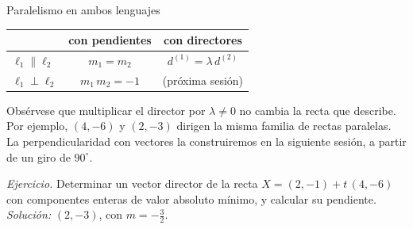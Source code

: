 \documentclass[aspectratio=169,10pt]{beamer}
\newcommand{\destaca}[1]{%
  \par\vspace{3pt}\noindent
  \colorbox{turquesaClaro}{%
    \parbox{\dimexpr\linewidth-2\fboxsep\relax}{\vspace{3pt}#1\vspace{3pt}}}%
  \par\vspace{3pt}}
\begin{document}
\begin{frame}{Paralelismo en ambos lenguajes}
  \centering
  {\small
  \begin{tabular}{@{}lcc@{}}
    \toprule
    & \textbf{con pendientes} & \textbf{con directores} \\
    \midrule
    $\ell_1 \parallel \ell_2$ & $m_1=m_2$ & $d^{(1)}=\lambda\, d^{(2)}$ \\
    $\ell_1 \perp \ell_2$ & $m_1\, m_2=-1$ & (próxima sesión) \\
    \bottomrule
  \end{tabular}}
  \par\vspace{0.5cm}
  \raggedright
  Obsérvese que multiplicar el director por $\lambda\neq 0$ no cambia
  la recta que describe. Por ejemplo, $(4,-6)$ y $(2,-3)$ dirigen la
  misma familia de rectas paralelas. La perpendicularidad con vectores
  la construiremos en la siguiente sesión, a partir de un giro de
  $90^\circ$.

  \vspace{0.3cm}
  \destaca{\textit{Ejercicio.} Determinar un vector director de la
  recta $X=(2,-1)+t\,(4,-6)$ con componentes enteras de valor absoluto
  mínimo, y calcular su pendiente.
  \\[3pt]{\small \textit{Solución:} $(2,-3)$, con
  $m=-\tfrac{3}{2}$.}}
\end{frame}
\end{document}
